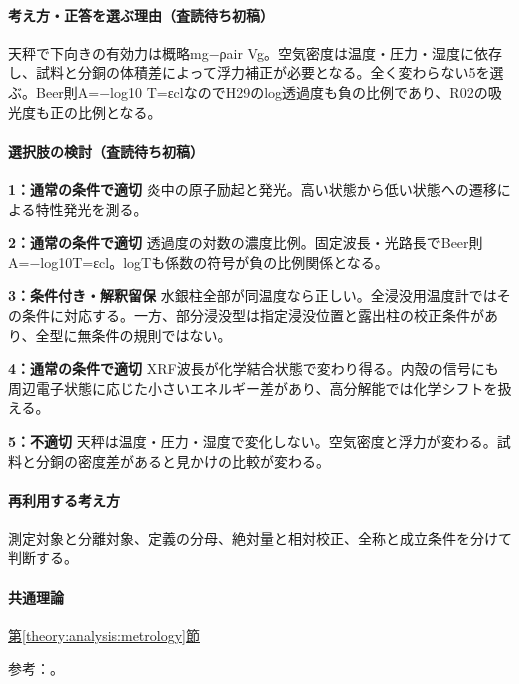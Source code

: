 \paragraph{考え方・正答を選ぶ理由（査読待ち初稿）} 天秤で下向きの有効力は概略mg−ρair Vg。空気密度は温度・圧力・湿度に依存し、試料と分銅の体積差によって浮力補正が必要となる。全く変わらない5を選ぶ。Beer則A=−log10 T=εclなのでH29のlog透過度も負の比例であり、R02の吸光度も正の比例となる。

\paragraph{選択肢の検討（査読待ち初稿）}\mbox{}\par

\noindent\textbf{1：通常の条件で適切} 炎中の原子励起と発光。高い状態から低い状態への遷移による特性発光を測る。\par

\noindent\textbf{2：通常の条件で適切} 透過度の対数の濃度比例。固定波長・光路長でBeer則A=−log10T=εcl。logTも係数の符号が負の比例関係となる。\par

\noindent\textbf{3：条件付き・解釈留保} 水銀柱全部が同温度なら正しい。全浸没用温度計ではその条件に対応する。一方、部分浸没型は指定浸没位置と露出柱の校正条件があり、全型に無条件の規則ではない。\par

\noindent\textbf{4：通常の条件で適切} XRF波長が化学結合状態で変わり得る。内殻の信号にも周辺電子状態に応じた小さいエネルギー差があり、高分解能では化学シフトを扱える。\par

\noindent\textbf{5：不適切} 天秤は温度・圧力・湿度で変化しない。空気密度と浮力が変わる。試料と分銅の密度差があると見かけの比較が変わる。\par

\paragraph{再利用する考え方} 測定対象と分離対象、定義の分母、絶対量と相対校正、全称と成立条件を分けて判断する。

\paragraph{共通理論} \hyperref[theory:analysis:metrology]{第\ref*{theory:analysis:metrology}節}

\par 参考：\cite{analysis49_beer_ref,analysis49_thermo_ref,analysis49_buoy_ref,analysis49_sxes_ref}。

